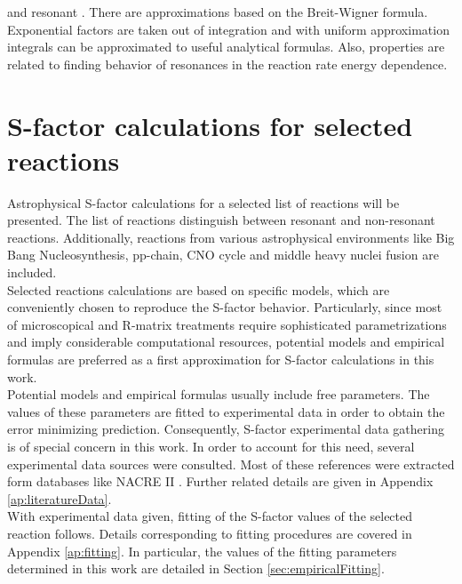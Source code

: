 \documentclass[openany]{book}
\begin{document}
 and resonant \cite{ueda_sargeant_pato_hussein_2004}. There are approximations based on the Breit-Wigner formula. Exponential factors are taken out of integration and with uniform approximation integrals can be approximated to useful analytical formulas. Also, properties are related to finding behavior of resonances in the reaction rate energy dependence.  \\


\chapter{S-factor calculations for selected reactions} \label{ch:sfactorCalculations}

Astrophysical S-factor calculations for a selected list of reactions will be presented. The list of reactions distinguish between resonant and non-resonant reactions. Additionally, reactions from various astrophysical environments like Big Bang Nucleosynthesis, pp-chain, CNO cycle and middle heavy nuclei fusion are included.  \\

Selected reactions calculations are based on specific models, which are conveniently chosen to reproduce the S-factor behavior. Particularly, since most of microscopical and R-matrix treatments require sophisticated parametrizations and imply considerable computational resources, potential models and empirical formulas are preferred as a first approximation for S-factor calculations in this work.  \\

Potential models and empirical formulas usually include free parameters. The values of these parameters are fitted to experimental data in order to obtain the error minimizing prediction. Consequently, S-factor experimental data gathering is of special concern in this work. In order to account for this need, several experimental data sources were consulted. Most of these references were extracted form databases like NACRE II \cite{xu_takahashi_goriely_arnould_ohta_utsunomiya_2013}. Further related details are given in Appendix \ref{ap:literatureData}. \\ 

With experimental data given, fitting of the S-factor values of the selected reaction follows. Details corresponding to fitting procedures are covered in Appendix \ref{ap:fitting}.  In particular, the values of the fitting parameters determined in this work are detailed in Section \ref{sec:empiricalFitting}.  \\
\end{document}
